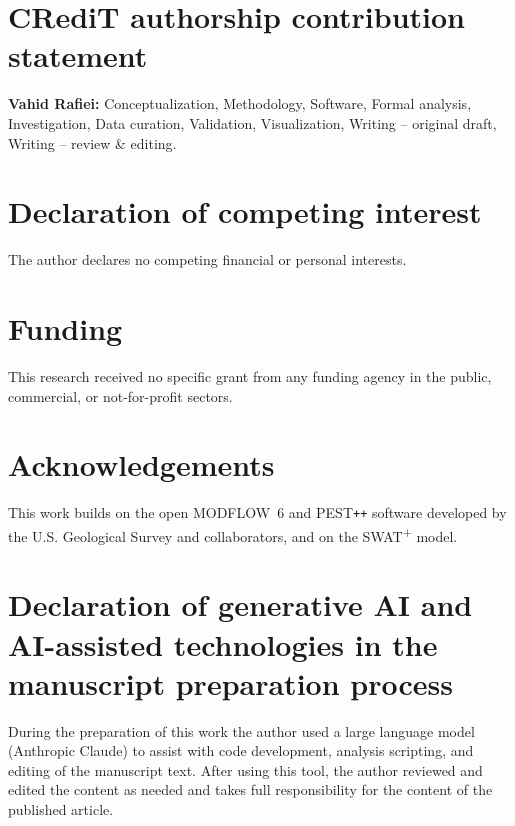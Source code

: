 \section*{CRediT authorship contribution statement}
\textbf{Vahid Rafiei:} Conceptualization, Methodology, Software, Formal analysis, Investigation, Data
curation, Validation, Visualization, Writing -- original draft, Writing -- review \& editing.

\section*{Declaration of competing interest}
The author declares no competing financial or personal interests.

\section*{Funding}
This research received no specific grant from any funding agency in the public, commercial, or
not-for-profit sectors.

\section*{Acknowledgements}
This work builds on the open MODFLOW~6 and PEST\texttt{++} software developed by the U.S.
Geological Survey and collaborators, and on the SWAT\textsuperscript{+} model.

\section*{Declaration of generative AI and AI-assisted technologies in the manuscript preparation process}
During the preparation of this work the author used a large language model (Anthropic Claude) to
assist with code development, analysis scripting, and editing of the manuscript text. After using this
tool, the author reviewed and edited the content as needed and takes full responsibility for the
content of the published article.
